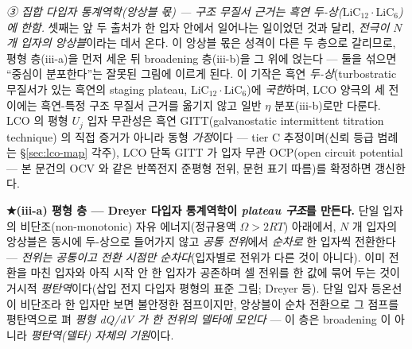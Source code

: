 \emph{③ 집합 다입자 통계역학(앙상블 몫) --- 구조 무질서 근거는 흑연 두-상($\mathrm{LiC_{12}}\cdot\mathrm{LiC_6}$)에 한함.} 셋째는 앞 두 출처가
한 입자 안에서 일어나는 일이었던 것과 달리, \emph{전극이 $N$ 개 입자의 앙상블}이라는 데서 온다. 이 앙상블 몫은 성격이
다른 두 층으로 갈리므로, 평형 층(iii-a)을 먼저 세운 뒤 broadening 층(iii-b)을 그 위에 얹는다 --- 둘을 섞으면 ``중심이
분포한다''는 잘못된 그림에 이르게 된다. 이 기작은 흑연 \emph{두-상}(turbostratic 무질서가 있는 흑연의 staging
plateau, $\mathrm{LiC_{12}}\cdot\mathrm{LiC_6}$)에 \emph{국한}하며, LCO 양극의 세 전이에는 흑연-특정 구조 무질서
근거를 옮기지 않고 일반 $\eta$ 분포(iii-b)로만 다룬다. LCO 의 평형 $U_j$ 입자 무관성은 흑연
GITT(galvanostatic intermittent titration technique)\cite{park2021} 의 직접 증거가 아니라 동형
\emph{가정}이다 --- tier C 추정이며(신뢰 등급 범례는 \S\ref{sec:lco-map} 각주), LCO 단독 GITT 가 입자
무관 OCP(open circuit potential --- 본 문건의 OCV 와 같은 반쪽전지 준평형 전위, 문헌 표기 따름)를
확정하면 갱신한다.

\textbf{★(iii-a) 평형 층 --- Dreyer 다입자 통계역학이 \emph{plateau 구조}를 만든다.} 단일 입자의 비단조(non-monotonic) 자유
에너지(정규용액 $\Omega>2RT$) 아래에서, $N$ 개 입자의 앙상블은 동시에 두-상으로 들어가지 않고 \emph{공통 전위}에서
\emph{순차로} 한 입자씩 전환한다 --- \emph{전위는 공통이고 전환 시점만 순차다}(입자별로 전위가 다른 것이 아니다). 이미
전환을 마친 입자와 아직 시작 안 한 입자가 공존하며 셀 전위를 한 값에 묶어 두는
것이 거시적 \emph{평탄역}이다(삽입 전지 다입자 평형의 표준 그림; Dreyer 등\cite{dreyer2010,dreyer2011}).
단일 입자 등온선이 비단조라 한 입자만 보면 불안정한 점프이지만, 앙상블이 순차 전환으로 그 점프를
평탄역으로 펴 \emph{평형 dQ/dV 가 한 전위의 델타에 모인다} --- 이 층은 broadening 이 아니라 \emph{평탄역(델타) 자체의 기원}이다.


